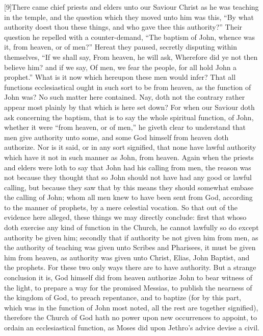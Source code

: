 [9]There came chief priests and elders unto our Saviour Christ as he was teaching in the temple, and the question which they moved unto him was this, “By what authority doest thou these things, and who gave thee this authority?” Their question he repelled with a counter-demand, “The baptism of John, whence was it, from heaven, or of men?” Hereat they paused, secretly disputing within themselves, “If we shall say, From heaven, he will ask, Wherefore did ye not then believe him? and if we say, Of men, we fear the people, for all hold John a prophet.” What is it now which hereupon these men would infer? That all functions ecclesiastical ought in such sort to be from heaven, as the function of John was? No such matter here contained. Nay, doth not the contrary rather appear most plainly by that which is here set down? For when our Saviour doth ask concerning the baptism, that is to say the whole spiritual function, of John, whether it were “from heaven, or of men,” he giveth clear to understand that men give authority unto  some,
 and some God himself from heaven doth authorize. Nor is it said, or in any sort signified, that none have lawful authority which have it not in such manner as John, from heaven. Again when the priests and elders were loth to say that John had his calling from men, the reason was not because they thought that so John should not have had any good or lawful calling, but because they saw that by this means they should somewhat embase the calling of John; whom all men knew to have been sent from God, according to the manner of prophets, by a mere celestial vocation. So that out of the evidence here alleged, these things we may directly conclude: first that whoso doth exercise any kind of function in the Church, he cannot lawfully so do except authority be given him; secondly that if authority be not given him from men, as the authority of teaching was given unto Scribes and Pharisees, it must be given him from heaven, as authority was given unto Christ, Elias, John Baptist, and the prophets. For these two only ways there are to have authority. But a strange conclusion it is, God himself did from heaven authorize John to bear witness of the light, to prepare a way for the promised Messias, to publish the nearness of the kingdom of God, to preach repentance, and to baptize (for by this part, which was in the function of John most noted, all the rest are together signified), therefore the Church of God hath no power upon new occurrences to appoint, to ordain an ecclesiastical function, as Moses did upon Jethro’s advice devise a civil.

